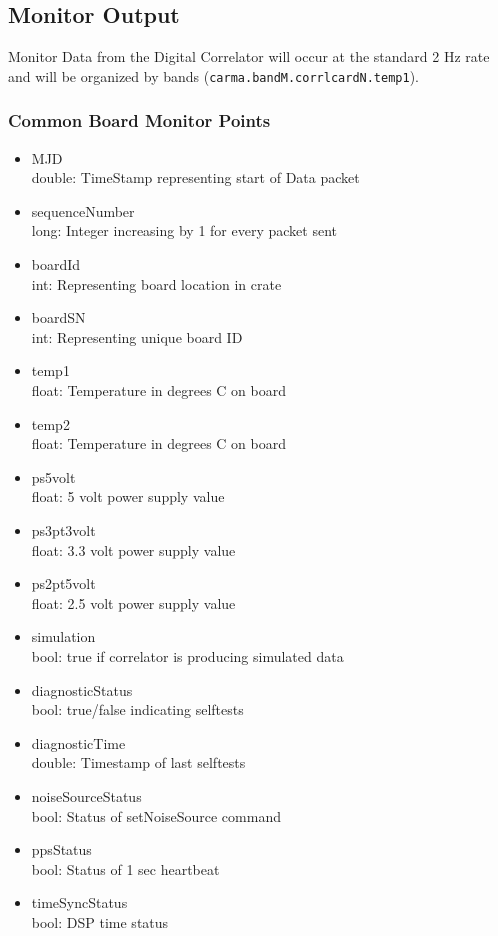 \documentclass[11pt]{article}
\begin{document}
\subsection{Monitor Output}
Monitor Data from the Digital Correlator will occur at the standard 2 Hz rate
and will be organized by bands ({\tt carma.bandM.corrlcardN.temp1}).

\vskip5mm

\subsubsection{Common Board Monitor Points}
\begin{itemize}
\item MJD \\
      double: TimeStamp representing start of Data packet
\item sequenceNumber \\
      long: Integer increasing by 1 for every packet sent
\item boardId \\
      int: Representing board location in crate
\item boardSN \\
      int: Representing unique board ID
\item temp1 \\
      float: Temperature in degrees C on board
\item temp2 \\
      float: Temperature in degrees C on board
\item ps5volt \\
      float: 5 volt power supply value
\item ps3pt3volt \\
      float: 3.3 volt power supply value
\item ps2pt5volt \\
      float: 2.5 volt power supply value
\item simulation \\
      bool: true if correlator is producing simulated data
\item diagnosticStatus \\
      bool: true/false indicating selftests
\item diagnosticTime \\
      double: Timestamp of last selftests
\item noiseSourceStatus \\
      bool: Status of setNoiseSource command
\item ppsStatus \\
      bool: Status of 1 sec heartbeat
\item timeSyncStatus \\
      bool: DSP time status
\end{itemize}
\end{document}
